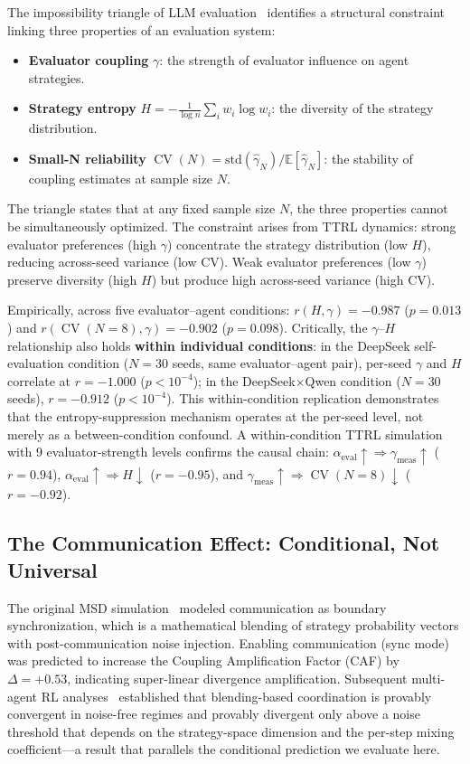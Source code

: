 \documentclass[11pt]{article}
\DeclareMathOperator{\CV}{CV}
\begin{document}
The impossibility triangle of LLM evaluation~\cite{liu2026impossible} identifies a structural constraint linking three properties of an evaluation system:
\begin{itemize}[leftmargin=*,nosep]
 \item \textbf{Evaluator coupling} $\gamma$: the strength of evaluator influence on agent strategies.
 \item \textbf{Strategy entropy} $H = -\frac{1}{\log n}\sum_i w_i \log w_i$: the diversity of the strategy distribution.
 \item \textbf{Small-N reliability} $\CV(N) = \text{std}(\hat{\gamma}_N) / \mathbb{E}[\hat{\gamma}_N]$: the stability of coupling estimates at sample size $N$.
\end{itemize}

The triangle states that at any fixed sample size $N$, the three properties cannot be simultaneously optimized. The constraint arises from TTRL dynamics: strong evaluator preferences (high $\gamma$) concentrate the strategy distribution (low $H$), reducing across-seed variance (low CV). Weak evaluator preferences (low $\gamma$) preserve diversity (high $H$) but produce high across-seed variance (high CV).

Empirically, across five evaluator--agent conditions: $r(H, \gamma) = -0.987$ ($p = 0.013$) and $r(\CV(N{=}8), \gamma) = -0.902$ ($p = 0.098$). Critically, the $\gamma$--$H$ relationship also holds \textbf{within individual conditions}: in the DeepSeek self-evaluation condition ($N{=}30$ seeds, same evaluator--agent pair), per-seed $\gamma$ and $H$ correlate at $r = -1.000$ ($p < 10^{-4}$); in the DeepSeek$\times$Qwen condition ($N{=}30$ seeds), $r = -0.912$ ($p < 10^{-4}$). This within-condition replication demonstrates that the entropy-suppression mechanism operates at the per-seed level, not merely as a between-condition confound. A within-condition TTRL simulation with 9 evaluator-strength levels confirms the causal chain: $\alpha_{\text{eval}} \uparrow \Rightarrow \gamma_{\text{meas}} \uparrow$ ($r = 0.94$), $\alpha_{\text{eval}} \uparrow \Rightarrow H \downarrow$ ($r = -0.95$), and $\gamma_{\text{meas}} \uparrow \Rightarrow \CV(N{=}8) \downarrow$ ($r = -0.92$).

\subsection{The Communication Effect: Conditional, Not Universal}

The original MSD simulation~\cite{liu2026epc} modeled communication as boundary synchronization, which is a mathematical blending of strategy probability vectors with post-communication noise injection. Enabling communication (sync mode) was predicted to increase the Coupling Amplification Factor (CAF) by $\Delta = +0.53$, indicating super-linear divergence amplification. Subsequent multi-agent RL analyses~\cite{kapetanakis2014balanced,foerster2016learning} established that blending-based coordination is provably convergent in noise-free regimes and provably divergent only above a noise threshold that depends on the strategy-space dimension and the per-step mixing coefficient---a result that parallels the conditional prediction we evaluate here.
\end{document}
